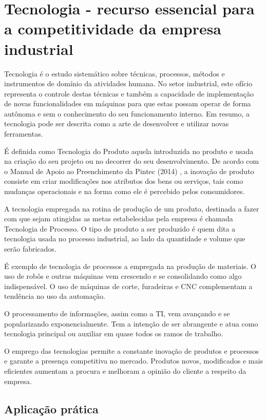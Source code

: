 \chapter{Tecnologia - recurso essencial para a competitividade da empresa industrial}
\label{chap:tecnologia_recurso}

Tecnologia é o estudo sistemático sobre técnicas, processos, métodos e instrumentos de domínio da atividades humana. No setor industrial, este ofício representa o controle destas técnicas e também a capacidade de implementação de novas funcionalidades em máquinas para que estas possam operar de forma autônoma e sem o conhecimento do seu funcionamento interno. Em resumo, a tecnologia pode ser descrita como a arte de desenvolver e utilizar novas ferramentas.

É definida como Tecnologia do Produto aquela introduzida no produto e usada na criação do seu projeto ou no decorrer do seu desenvolvimento. De acordo com o Manual de Apoio ao Preenchimento da Pintec (2014) %
, a inovação de produto consiste em criar modificações nos atributos dos bens ou serviços, tais como mudanças operacionais e na forma como ele é percebido pelos consumidores.

A tecnologia empregada na rotina de produção de um produto, destinada a fazer com que sejam atingidas as metas estabelecidas pela empresa é chamada Tecnologia de Processo. O tipo de produto a ser produzido é quem dita a tecnologia usada no processo industrial, ao lado da quantidade e volume que serão fabricados.

É exemplo de tecnologia de processos a empregada na produção de materiais. O uso de robôs e outras máquinas vem crescendo e se consolidando como algo indispensável. O uso de máquinas de corte, furadeiras e \ac{CNC} complementam a tendência no uso da automação.

O processamento de informações, assim como a \ac{TI}, vem avançando e se popularizando exponencialmente. Tem a intenção de ser abrangente e atua como tecnologia principal ou auxiliar em quase todos os ramos de trabalho.

O emprego das tecnologias permite a constante inovação de produtos e processos e garante a presença competitiva no mercado. Produtos novos, modificados e mais eficientes aumentam a procura e melhoram a opinião do cliente a respeito da empresa.


\section{Aplicação prática}
\label{sec:tecnologia_recurso_aplicacao}

